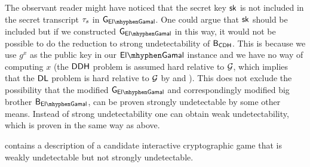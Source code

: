 \begin{rem}
The observant reader might have noticed that the secret key $\mathsf{sk}$ is not included in the secret transcript $\tau_s$ in $\cgame_{\elGamal}$. One could argue that $\mathsf{sk}$ should be included but if we constructed $\cgame_{\elGamal}$ in this way, it would not be possible to do the reduction to strong undetectability of $\mathsf{B}_{\mathsf{CDH}}$. This is because we use $g^x$ as the public key in our $\elGamal$ instance and we have no way of computing $x$ (the $\mathsf{DDH}$ problem is assumed hard relative to $\operatorname{\mathcal{G}}$, which implies that the $\mathsf{DL}$ problem is hard relative to $\operatorname{\mathcal{G}}$ by  and ). This does not exclude the possibility that the modified $\cgame_{\elGamal}$ and correspondingly modified big brother $\bb_{\elGamal}$, can be proven strongly undetectable by some other means. Instead of strong undetectability one can obtain weak undetectability, which is proven in the same way as above.
\end{rem}

 contains a description of a candidate interactive cryptographic game that is weakly undetectable but not strongly undetectable. 
 

